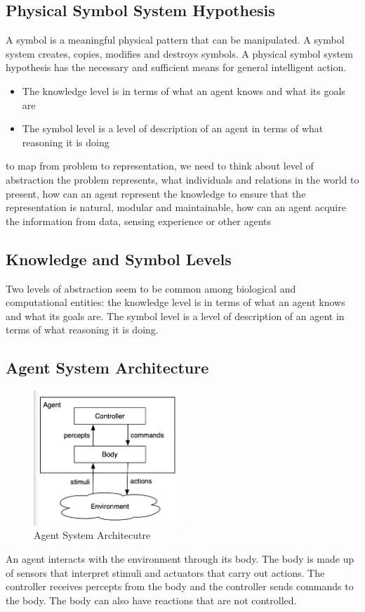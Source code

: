\documentclass[a4paper]{article}
\theoremstyle{plain}
\theoremstyle{definition}
\theoremstyle{remark}
\begin{document}
\subsection{Physical Symbol System Hypothesis}
A symbol is a meaningful physical pattern that can be manipulated. A symbol system creates, copies, modifies and destroys symbols. A physical symbol system hypothesis has the necessary and sufficient means for general intelligent action.
\begin{itemize}
	\item The knowledge level is in terms of what an agent knows and what its goals are
	\item The symbol level is a level of description of an agent in terms of what reasoning it is doing
\end{itemize}
to map from problem to representation, we need to think about level of abstraction the problem represents, what individuals and relations in the world to present, how can an agent represent the knowledge to ensure that the representation is natural, modular and maintainable, how can an agent acquire the information from data, sensing experience or other agents
\subsection{Knowledge and Symbol Levels}
Two levels of abstraction seem to be common among biological and computational entities: the knowledge level is in terms of what an agent knows and what its goals are. The symbol level is a level of description of an agent in terms of what reasoning it is doing.
\subsection{Agent System Architecture}
\begin{figure}[H]
	\centering
	\includegraphics[width=0.5\textwidth]{1.png}
	\caption{Agent System Architecutre}
	\label{fig:1-png}
\end{figure}
An agent interacts with the environment through its body. The body is made up of sensors that interpret stimuli and actuators that carry out actions. The controller receives percepts from the body and the controller sends commands to the body. The body can also have reactions that are not controlled.
\end{document}

